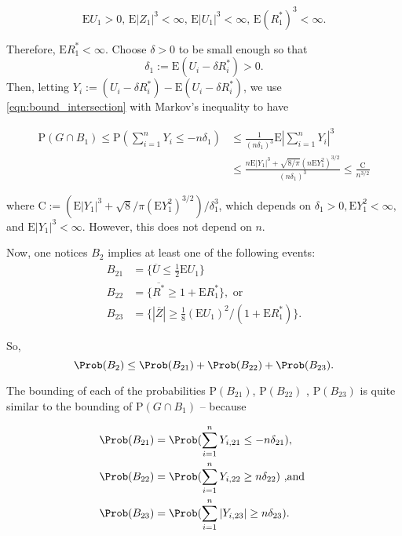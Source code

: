 \[
\mathrm{E}U_{1}>0,\, \mathrm{E}|Z_{1}|^{3}<\infty,\, \mathrm{E}|U_{1}|^{3}<\infty,\, \mathrm{E}(R_{1}^{*})^{3}<\infty.
\]

Therefore, $\mathrm{E}R_{1}^{*}<\infty$. Choose $\delta>0$ to be small enough so that
$$
\delta_{1}:=\mathrm{E}(U_{i}-\delta R_{i}^{*})>0.
$$
Then, letting $Y_{i} :=(U_{i}-\delta R_{i}^{*})-\mathrm{E}(U_{i}-\delta R_{i}^{*})$, we use \eqref{eqn:bound_intersection} with Markov's inequality to have

\begin{align*}
\mathrm{P}(G\cap B_{1})\leq \mathrm{P}(\sum_{i=1}^{n}Y_{i}\leq-n\delta_{1})&\leq\frac{1}{(n\delta_{1})^{3}}\mathrm{E}|\sum_{i=1}^{n}Y_{i}|^{3}
\\
&\leq\frac{n\mathrm{E}|Y_{1}|^{3}+\sqrt{8/\pi}(n\mathrm{E}Y_{1}^{2})^{3/2}}{(n\delta_{1})^{3}}\leq\frac{\mathrm{C}}{n^{3/2}}
\end{align*}

where $\mathrm{C}:=(\mathrm{E}|Y_{1}|^{3}+\sqrt{8}/\pi(\mathrm{E}Y_{1}^{2})^{3/2})/\delta_{1}^{3}$, which depends on $\delta_{1}>0, \mathrm{E}Y_{1}^{2}<\infty,$ and $\mathrm{E}|Y_{1}|^{3}<\infty$. However, this does not depend on $n$.

Now, one notices $B_{2}$ implies at least one of the following events:
\begin{align*}
B_{21} &=\displaystyle\{\overline{U}\leq\frac{1}{2}\mathrm{E}U_{1}\} \\
 B_{22} &=\{\overline{R^{*}}\geq 1+\mathrm{E}R_{1}^{*}\}, \textrm{ or}\\ 
 B_{23} &= \displaystyle \{|\overline{Z}|\geq\frac{1}{8}(\mathrm{E}U_{1})^{2}/(1+\mathrm{E}R_{1}^{*})\}. 
\end{align*}

So,
\begin{equation}
\Prob(B_{2})\leq \Prob(B_{21})+\Prob(B_{22})+\Prob(B_{23}).
\end{equation}

The bounding of each of the probabilities $\mathrm{P}(B_{21})$, $\mathrm{P}(B_{22})$ , $\mathrm{P}(B_{23})$ is quite similar to the bounding of $\mathrm{P}(G\cap B_{1})$ -- because 

\begin{align*}
\Prob(B_{21})&=\Prob(\sum_{i=1}^{n}Y_{i,21}\leq-n\delta_{21}), \\
\Prob(B_{22})&=\Prob(\sum_{i=1}^{n}Y_{i,22}\geq n\delta_{22}) \textrm{ ,and } \\ 
\Prob(B_{23})&= \Prob(\sum_{i=1}^{n}|Y_{i,23}|\geq n\delta_{23}).
\end{align*} 

